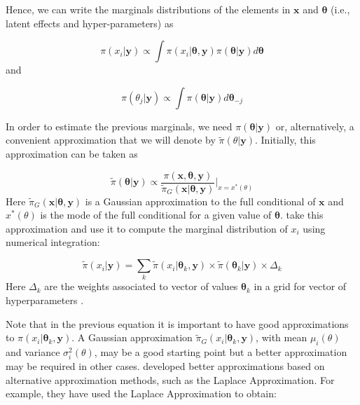\documentclass[article]{jss}
\begin{document}
Hence, we can write the marginals distributions of the elements in $\mathbf{x}$
and $\mathbf{\theta}$ (i.e., latent effects and hyper-parameters) as


\begin{equation}
\pi(x_i|\mathbf{y}) \propto \int \pi(x_i|\mathbf{\theta}, \mathbf{y})  \pi(\mathbf{\theta}| \mathbf{y}) d\mathbf{\theta}
\end{equation}
\noindent
and

\begin{equation}
\pi(\theta_j|\mathbf{y}) \propto \int \pi(\mathbf{\theta}| \mathbf{y})  d\mathbf{\theta}_{-j} 
\end{equation}

In order to estimate the previous marginals, we need 
$\pi(\mathbf{\theta}|\mathbf{y})$ or, alternatively, a convenient
approximation that we will denote by $\tilde\pi(\theta|\mathbf{y})$.
Initially, this approximation can be taken as

\begin{equation}
\tilde\pi(\mathbf{\theta}|\mathbf{y})\propto 
\frac{\pi(\mathbf{x},\mathbf{\theta},\mathbf{y})}{\tilde\pi_G(\mathbf{x}|\mathbf{\theta},\mathbf{y})}\bigg|_{x=x^*(\theta)}
\end{equation}
\noindent
Here 
$\tilde\pi_G(\mathbf{x}|\mathbf{\theta},\mathbf{y})$ is a Gaussian
approximation to the full conditional of $\mathbf{x}$ and $x^*(\theta)$
is the mode of the full conditional for a given value of $\mathbf{\theta}$.
\citet{isi:000264374200002} take this approximation and use it 
to compute the marginal distribution of $x_i$ using numerical integration:

\begin{equation}
\tilde\pi(x_i|\mathbf{y})= 
\sum_k \tilde\pi (x_i|\mathbf{\theta}_k, \mathbf{y})\times 
\tilde\pi(\mathbf{\theta}_k|\mathbf{y})\times \Delta_k
\end{equation}
\noindent
Here $\Delta_k$ are the weights associated to vector of values
$\mathbf{\theta}_k$ in a grid for vector of hyperparameters .


Note that in the previous equation it is important to have good approximations
to $\pi (x_i|\mathbf{\theta}_k, \mathbf{y})$. A Gaussian approximation
$\tilde\pi_G (x_i|\mathbf{\theta}_k, \mathbf{y})$, with mean $\mu_i(\theta)$
and variance $\sigma^2_i(\theta)$, may be a good starting point but a better
approximation may be required in other cases. \citet{isi:000264374200002}
developed better approximations based on alternative approximation methods,
such as the Laplace Approximation.  For example, they have used the Laplace
Approximation to obtain:
\end{document}
